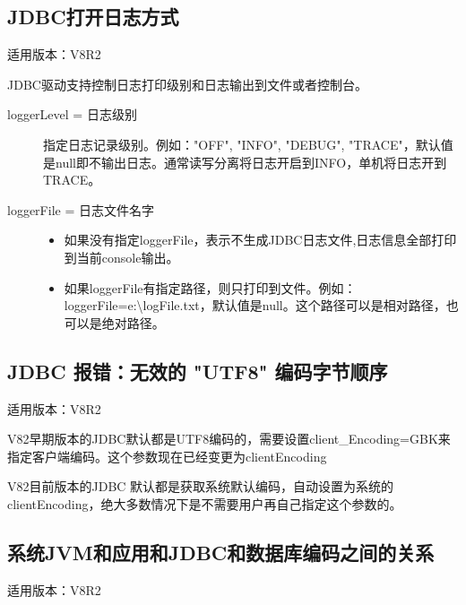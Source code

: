 \documentclass[a4,10pt,oneside,english]{sphinxmanual}
\begin{document}
\subsection{JDBC打开日志方式}
\label{\detokenize{interface/jdbc:id11}}
适用版本：V8R2

JDBC驱动支持控制日志打印级别和日志输出到文件或者控制台。

\begin{description}
\item[{loggerLevel = 日志级别}] \leavevmode
指定日志记录级别。例如："OFF", "INFO", "DEBUG", "TRACE"，默认值是null即不输出日志。通常读写分离将日志开启到INFO，单机将日志开到TRACE。

\end{description}

\begin{description}
\item[{loggerFile = 日志文件名字}] \leavevmode
{}
\begin{itemize}
\item {} 
如果没有指定loggerFile，表示不生成JDBC日志文件,日志信息全部打印到当前console输出。

\item {} 
如果loggerFile有指定路径，则只打印到文件。例如：loggerFile=e:\textbackslash{}logFile.txt，默认值是null。这个路径可以是相对路径，也可以是绝对路径。

\end{itemize}

\end{description}


\subsection{JDBC 报错：无效的 "UTF8" 编码字节顺序}
\label{\detokenize{interface/jdbc:jdbc-utf8}}
适用版本：V8R2

V82早期版本的JDBC默认都是UTF8编码的，需要设置client\_Encoding=GBK来指定客户端编码。这个参数现在已经变更为clientEncoding

V82目前版本的JDBC 默认都是获取系统默认编码，自动设置为系统的clientEncoding，绝大多数情况下是不需要用户再自己指定这个参数的。


\subsection{系统JVM和应用和JDBC和数据库编码之间的关系}
\label{\detokenize{interface/jdbc:jvmjdbc}}
适用版本：V8R2
\end{document}
